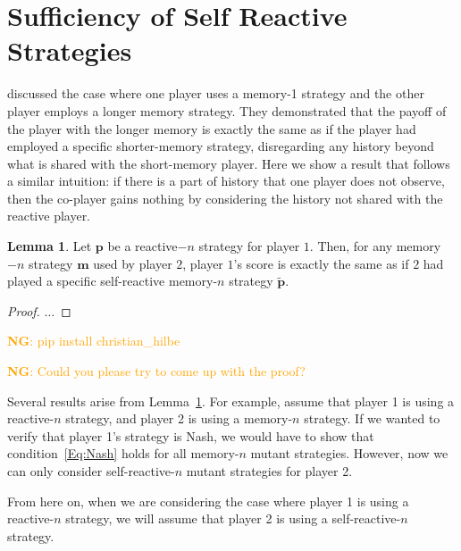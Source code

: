 \documentclass[11pt]{article}
\newcommand{\nikoleta}[1]{\textcolor{orange}{\textbf{NG}: #1}}
\theoremstyle{definition}
\newtheorem{lemma}[theorem]{Lemma}
\begin{document}

\section{Sufficiency of Self Reactive Strategies}\label{section:self_reactive_sufficiency}


\cite{press:PNAS:2012} discussed the case where one player uses a memory-1
strategy and the other player employs a longer memory strategy. They
demonstrated that the payoff of the player with the longer memory is exactly the
same as if the player had employed a specific shorter-memory strategy,
disregarding any history beyond what is shared with the short-memory player.
Here we show a result that follows a similar intuition: if there is a part of
history that one player does not observe, then the co-player gains nothing by
considering the history not shared with the reactive player.

\begin{lemma}\label{lemma:self_reactive_sufficiency}
  Let $\mathbf{p}$ be a reactive$-n$ strategy for player $1$. Then, for any
  memory$-n$ strategy $\mathbf{m}$ used by player $2$, player $1$'s score is
  exactly the same as if $2$ had played a specific self-reactive memory-$n$
  strategy $\mathbf{\tilde{p}}$.
\end{lemma}

\begin{proof}
$\dots$
\end{proof}

\nikoleta{pip install christian\_hilbe}

\nikoleta{Could you please try to come up with the proof?}

Several results arise from Lemma~\ref{lemma:self_reactive_sufficiency}. For
example, assume that player 1 is using a reactive-$n$ strategy, and player 2 is
using a memory-$n$ strategy. If we wanted to verify that player 1's strategy is
Nash, we would have to show that condition~\eqref{Eq:Nash} holds for all
memory-$n$ mutant strategies. However, now we can only consider
self-reactive-$n$ mutant strategies for player 2.

From here on, when we are considering the case where player 1 is using a
reactive-$n$ strategy, we will assume that player 2 is using a self-reactive-$n$
strategy.
\end{document}

